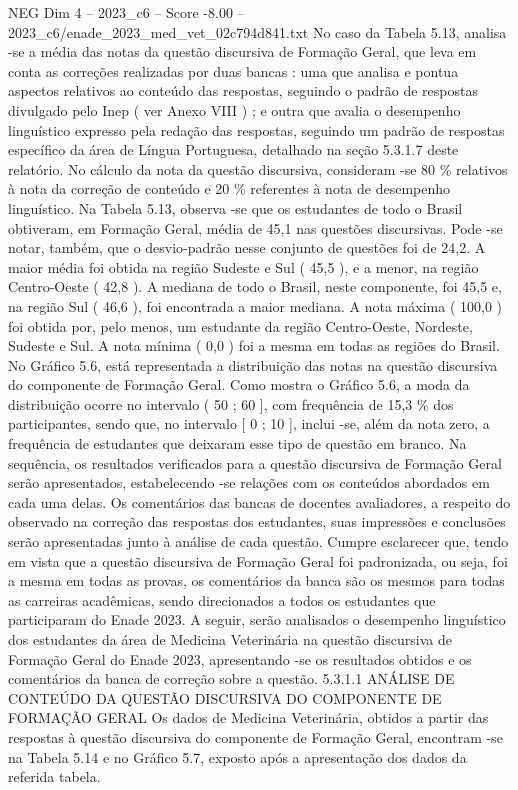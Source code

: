 \begin{textsample}{NEG Dim 4 – 2023\_c6 – Score -8.00 – 2023\_c6/enade\_2023\_med\_vet\_02c794d841.txt}
No caso da Tabela 5.13, analisa -se a média das notas da questão discursiva de Formação Geral, que leva em conta as correções realizadas por duas bancas : uma que analisa e pontua aspectos relativos ao conteúdo das respostas, seguindo o padrão de respostas divulgado pelo Inep ( ver Anexo VIII ) ; e outra que avalia o desempenho linguístico expresso pela redação das respostas, seguindo um padrão de respostas específico da área de Língua Portuguesa, detalhado na seção 5.3.1.7 deste relatório.
No cálculo da nota da questão discursiva, consideram -se 80 \% relativos à nota da correção de conteúdo e 20 \% referentes à nota de desempenho linguístico.
Na Tabela 5.13, observa -se que os estudantes de todo o Brasil obtiveram, em Formação Geral, média de 45,1 nas questões discursivas.
Pode -se notar, também, que o desvio-padrão nesse conjunto de questões foi de 24,2.
A maior média foi obtida na região Sudeste e Sul ( 45,5 ), e a menor, na região Centro-Oeste ( 42,8 ).
A mediana de todo o Brasil, neste componente, foi 45,5 e, na região Sul ( 46,6 ), foi encontrada a maior mediana.
A nota máxima ( 100,0 ) foi obtida por, pelo menos, um estudante da região Centro-Oeste, Nordeste, Sudeste e Sul.
A nota mínima ( 0,0 ) foi a mesma em todas as regiões do Brasil.
No Gráfico 5.6, está representada a distribuição das notas na questão discursiva do componente de Formação Geral.
Como mostra o Gráfico 5.6, a moda da distribuição ocorre no intervalo ( 50 ; 60 ], com frequência de 15,3 \% dos participantes, sendo que, no intervalo [ 0 ; 10 ], inclui -se, além da nota zero, a frequência de estudantes que deixaram esse tipo de questão em branco.
Na sequência, os resultados verificados para a questão discursiva de Formação Geral serão apresentados, estabelecendo -se relações com os conteúdos abordados em cada uma delas.
Os comentários das bancas de docentes avaliadores, a respeito do observado na correção das respostas dos estudantes, suas impressões e conclusões serão apresentadas junto à análise de cada questão.
Cumpre esclarecer que, tendo em vista que a questão discursiva de Formação Geral foi padronizada, ou seja, foi a mesma em todas as provas, os comentários da banca são os mesmos para todas as carreiras acadêmicas, sendo direcionados a todos os estudantes que participaram do Enade 2023.
A seguir, serão analisados o desempenho linguístico dos estudantes da área de Medicina Veterinária na questão discursiva de Formação Geral do Enade 2023, apresentando -se os resultados obtidos e os comentários da banca de correção sobre a questão. 5.3.1.1 ANÁLISE DE CONTEÚDO DA QUESTÃO DISCURSIVA DO COMPONENTE DE FORMAÇÃO GERAL Os dados de Medicina Veterinária, obtidos a partir das respostas à questão discursiva do componente de Formação Geral, encontram -se na Tabela 5.14 e no Gráfico 5.7, exposto após a apresentação dos dados da referida tabela.

\end{textsample}
